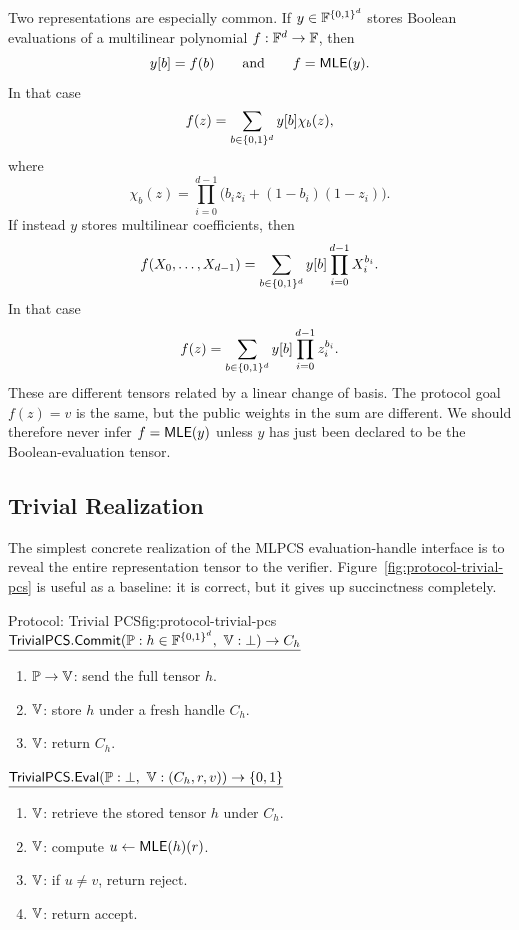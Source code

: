 Two representations are especially common.  If \(y\in\mathbb{F}^{\{0,1\}^d}\) stores Boolean
evaluations of a multilinear polynomial \(f:\mathbb{F}^d\to\mathbb{F}\), then
\[
  y[b]=f(b)
  \qquad\text{and}\qquad
  f=\mathsf{MLE}(y).
\]
In that case
\[
  f(z)
  =
  \sum_{b\in\{0,1\}^d} y[b]\chi_b(z),
\]
where
\[
  \chi_b(z)
  =
  \prod_{i=0}^{d-1}\bigl(b_i z_i+(1-b_i)(1-z_i)\bigr).
\]
If instead \(y\) stores multilinear coefficients, then
\[
  f(X_0,\ldots,X_{d-1})
  =
  \sum_{b\in\{0,1\}^d} y[b]\prod_{i=0}^{d-1}X_i^{b_i}.
\]
In that case
\[
  f(z)
  =
  \sum_{b\in\{0,1\}^d} y[b]\prod_{i=0}^{d-1}z_i^{b_i}.
\]
These are different tensors related by a linear change of basis.  The protocol
goal \(f(z)=v\) is the same, but the public weights in the sum are different.
We should therefore never infer \(f=\mathsf{MLE}(y)\) unless \(y\) has just been declared to
be the Boolean-evaluation tensor.

\subsection{Trivial Realization}

The simplest concrete realization of the MLPCS evaluation-handle interface is
to reveal the entire representation tensor to the verifier.
Figure~\ref{fig:protocol-trivial-pcs} is useful as a baseline: it is correct,
but it gives up succinctness completely.

\begin{protocolbox}{Protocol: Trivial PCS}{fig:protocol-trivial-pcs}
\noindent\(\underline{\mathsf{TrivialPCS.Commit}(\prover:h\in\F^{\B^d},\ \verifier:\bot)\to C_h}\)

\smallskip
\begin{enumerate}[leftmargin=0.24in,label=\textbf{T\arabic*.},itemsep=0.08em,topsep=0.1em,parsep=0pt]
  \item \(\mathbb{P}\to\mathbb{V}\): send the full tensor \(h\).
  \item \(\mathbb{V}\): store \(h\) under a fresh handle \(C_h\).
  \item \(\mathbb{V}\): return \(C_h\).
\end{enumerate}

\smallskip
\noindent\(\underline{\mathsf{TrivialPCS.Eval}(\prover:\bot,\ \verifier:(C_h,r,v))\to\{0,1\}}\)

\smallskip
\begin{enumerate}[leftmargin=0.24in,label=\textbf{U\arabic*.},itemsep=0.08em,topsep=0.1em,parsep=0pt]
  \item \(\mathbb{V}\): retrieve the stored tensor \(h\) under \(C_h\).
  \item \(\mathbb{V}\): compute \(u\gets \mathsf{MLE}(h)(r)\).
  \item \(\mathbb{V}\): if \(u\ne v\), return reject.
  \item \(\mathbb{V}\): return accept.
\end{enumerate}
\end{protocolbox}

